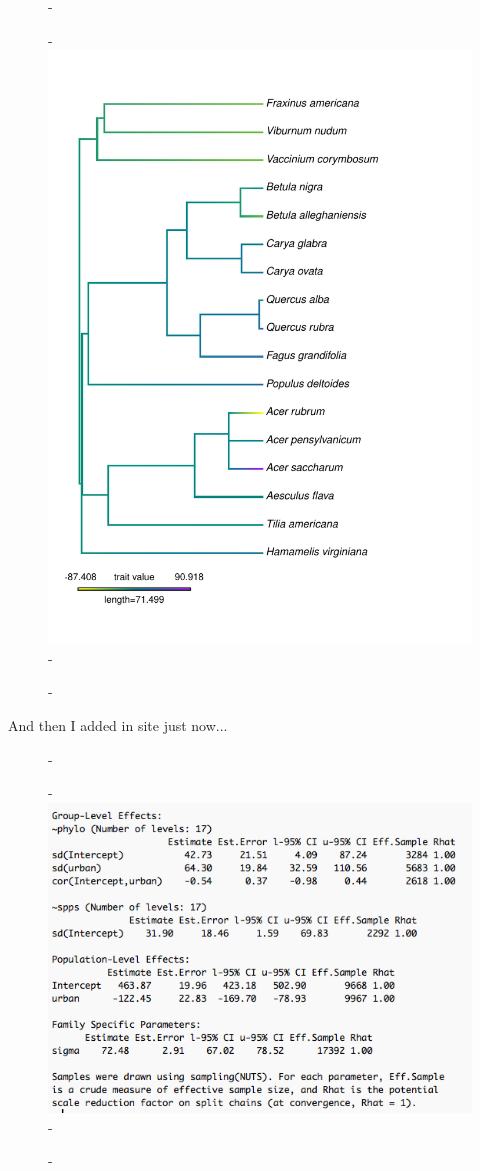 \documentclass{article}\usepackage[]{graphicx}\usepackage[]{color}
\begin{document}
  
  {\begin{figure} [H]
  -\begin{center}
  -\includegraphics[width=12cm]{..//analyses/figures/phylomod_treenourban.pdf}
  -\end{center}
  -\end{figure}}
  
  And then I added in site just now...
  
  {\begin{figure} [H]
  -\begin{center}
  -\includegraphics[width=12cm]{..//analyses/figures/phylowithurban}
  -\end{center}
  -\end{figure}}
  
\end{document}
